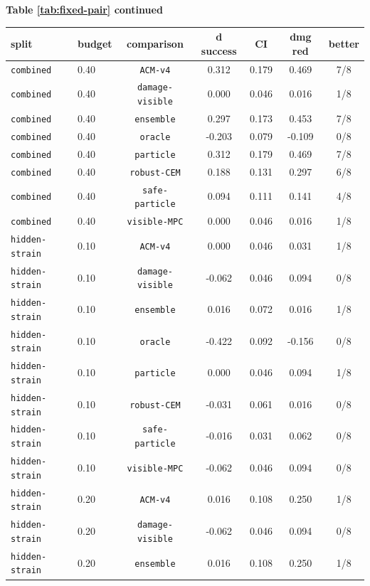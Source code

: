 \documentclass{article}
\begin{document}
\begin{center}
\textbf{Table \ref{tab:fixed-pair} continued}\\[0.4ex]
\begin{tabular}{llccccc}
\toprule
split & budget & comparison & d success & CI & dmg red & better \\
\midrule
\texttt{combined} & 0.40 & \texttt{ACM-v4} & 0.312 & 0.179 & 0.469 & 7/8 \\
\texttt{combined} & 0.40 & \texttt{damage-visible} & 0.000 & 0.046 & 0.016 & 1/8 \\
\texttt{combined} & 0.40 & \texttt{ensemble} & 0.297 & 0.173 & 0.453 & 7/8 \\
\texttt{combined} & 0.40 & \texttt{oracle} & -0.203 & 0.079 & -0.109 & 0/8 \\
\texttt{combined} & 0.40 & \texttt{particle} & 0.312 & 0.179 & 0.469 & 7/8 \\
\texttt{combined} & 0.40 & \texttt{robust-CEM} & 0.188 & 0.131 & 0.297 & 6/8 \\
\texttt{combined} & 0.40 & \texttt{safe-particle} & 0.094 & 0.111 & 0.141 & 4/8 \\
\texttt{combined} & 0.40 & \texttt{visible-MPC} & 0.000 & 0.046 & 0.016 & 1/8 \\
\texttt{hidden-strain} & 0.10 & \texttt{ACM-v4} & 0.000 & 0.046 & 0.031 & 1/8 \\
\texttt{hidden-strain} & 0.10 & \texttt{damage-visible} & -0.062 & 0.046 & 0.094 & 0/8 \\
\texttt{hidden-strain} & 0.10 & \texttt{ensemble} & 0.016 & 0.072 & 0.016 & 1/8 \\
\texttt{hidden-strain} & 0.10 & \texttt{oracle} & -0.422 & 0.092 & -0.156 & 0/8 \\
\texttt{hidden-strain} & 0.10 & \texttt{particle} & 0.000 & 0.046 & 0.094 & 1/8 \\
\texttt{hidden-strain} & 0.10 & \texttt{robust-CEM} & -0.031 & 0.061 & 0.016 & 0/8 \\
\texttt{hidden-strain} & 0.10 & \texttt{safe-particle} & -0.016 & 0.031 & 0.062 & 0/8 \\
\texttt{hidden-strain} & 0.10 & \texttt{visible-MPC} & -0.062 & 0.046 & 0.094 & 0/8 \\
\texttt{hidden-strain} & 0.20 & \texttt{ACM-v4} & 0.016 & 0.108 & 0.250 & 1/8 \\
\texttt{hidden-strain} & 0.20 & \texttt{damage-visible} & -0.062 & 0.046 & 0.094 & 0/8 \\
\texttt{hidden-strain} & 0.20 & \texttt{ensemble} & 0.016 & 0.108 & 0.250 & 1/8 \\

\end{tabular}
\end{center}
\end{document}
